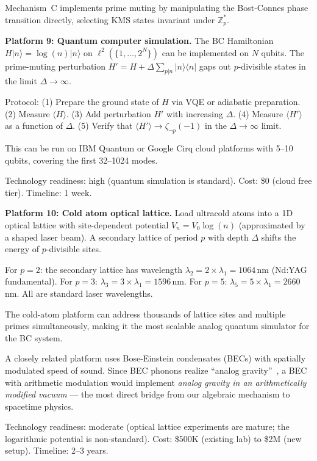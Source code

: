 \documentclass[11pt,a4paper]{article}
\begin{document}
Mechanism~C implements prime muting by manipulating the
Bost-Connes phase transition directly, selecting KMS states
invariant under $\mathbb{Z}_p^*$.

\textbf{Platform 9: Quantum computer simulation.}
The BC Hamiltonian $H|n\rangle = \log(n)|n\rangle$ on
$\ell^2(\{1, \ldots, 2^N\})$ can be implemented on $N$ qubits.
The prime-muting perturbation
$H' = H + \Delta \sum_{p|n} |n\rangle\langle n|$
gaps out $p$-divisible states in the limit $\Delta \to \infty$.

Protocol:
(1) Prepare the ground state of $H$ via VQE or adiabatic preparation.
(2) Measure $\langle H \rangle$.
(3) Add perturbation $H'$ with increasing $\Delta$.
(4) Measure $\langle H' \rangle$ as a function of $\Delta$.
(5) Verify that $\langle H' \rangle \to \zeta_{\neg p}(-1)$
in the $\Delta \to \infty$ limit.

This can be run on IBM Quantum or Google Cirq cloud platforms
with 5--10 qubits, covering the first 32--1024 modes.

Technology readiness: high (quantum simulation is standard).
Cost: \$0 (cloud free tier). Timeline: 1 week.

\textbf{Platform 10: Cold atom optical lattice.}
Load ultracold atoms into a 1D optical lattice with
site-dependent potential $V_n = V_0 \log(n)$
(approximated by a shaped laser beam).
A secondary lattice of period $p$ with depth $\Delta$
shifts the energy of $p$-divisible sites.

For $p = 2$: the secondary lattice has wavelength
$\lambda_2 = 2 \times \lambda_1 = 1064$\,nm (Nd:YAG fundamental).
For $p = 3$: $\lambda_3 = 3 \times \lambda_1 = 1596$\,nm.
For $p = 5$: $\lambda_5 = 5 \times \lambda_1 = 2660$\,nm.
All are standard laser wavelengths.

The cold-atom platform can address thousands of lattice sites
and multiple primes simultaneously, making it the most scalable
analog quantum simulator for the BC system.

A closely related platform uses Bose-Einstein condensates (BECs)
with spatially modulated speed of sound. Since BEC phonons
realize ``analog gravity''~\cite{Unruh1981}, a BEC with
arithmetic modulation would implement
\emph{analog gravity in an arithmetically modified vacuum} ---
the most direct bridge from our algebraic mechanism to
spacetime physics.

Technology readiness: moderate (optical lattice experiments
are mature; the logarithmic potential is non-standard).
Cost: \$500K (existing lab) to \$2M (new setup).
Timeline: 2--3 years.
\end{document}
